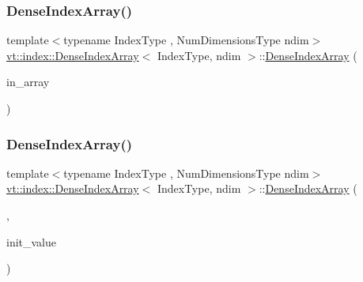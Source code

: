 \mbox{\label{structvt_1_1index_1_1_dense_index_array_a2d67c042ae2ac46fb32063ac63c994e8}} 
\subsubsection{\texorpdfstring{Dense\+Index\+Array()}{DenseIndexArray()}\hspace{0.1cm}{\footnotesize\ttfamily [5/6]}}
{\footnotesize\ttfamily template$<$typename Index\+Type , Num\+Dimensions\+Type ndim$>$ \\
\hyperlink{structvt_1_1index_1_1_dense_index_array}{vt\+::index\+::\+Dense\+Index\+Array}$<$ Index\+Type, ndim $>$\+::\hyperlink{structvt_1_1index_1_1_dense_index_array}{Dense\+Index\+Array} (\begin{DoxyParamCaption}\item[{std\+::array$<$ Index\+Type, ndim $>$}]{in\+\_\+array }\end{DoxyParamCaption})}

\mbox{\label{structvt_1_1index_1_1_dense_index_array_aa53dfdb3cad352ad2d1d5701d5a4eb3f}} 
\subsubsection{\texorpdfstring{Dense\+Index\+Array()}{DenseIndexArray()}\hspace{0.1cm}{\footnotesize\ttfamily [6/6]}}
{\footnotesize\ttfamily template$<$typename Index\+Type , Num\+Dimensions\+Type ndim$>$ \\
\hyperlink{structvt_1_1index_1_1_dense_index_array}{vt\+::index\+::\+Dense\+Index\+Array}$<$ Index\+Type, ndim $>$\+::\hyperlink{structvt_1_1index_1_1_dense_index_array}{Dense\+Index\+Array} (\begin{DoxyParamCaption}\item[{Dense\+Index\+Array\+Single\+Init\+Tag}]{,  }\item[{Index\+Type const \&}]{init\+\_\+value }\end{DoxyParamCaption})}



